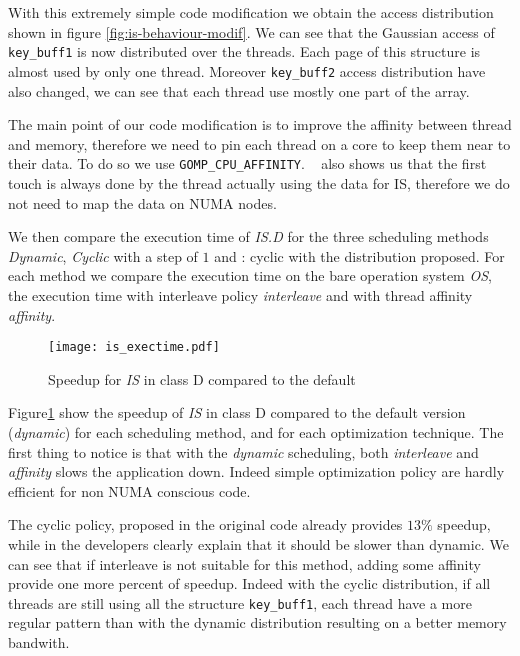 With this extremely simple code modification we obtain the access distribution
shown in figure \ref{fig:is-behaviour-modif}. We can see that the Gaussian
access of \texttt{key\_buff1} is now distributed over the threads. Each page
of this structure is almost used by only one thread. Moreover
\texttt{key\_buff2} access distribution have also changed, we can see that
each thread use mostly one part of the array.

The main point of our code modification is to improve the affinity between
thread and memory, therefore we need to pin each thread on a core to keep them
near to their data. To do so we use \texttt{GOMP\_CPU\_AFFINITY}. \TABARNAC~
also shows us that the first touch is always done by the thread actually using
the data for IS, therefore we do not need to map the data on NUMA nodes.

We then compare the execution time of \emph{IS.D} for the three scheduling
methods \emph{Dynamic}, \emph{Cyclic} with a step of $1$ and \TABARNAC:
cyclic with the distribution proposed. For each method we compare the
execution time on the bare operation system \emph{OS}, the execution time with
interleave policy \emph{interleave} and with thread affinity \emph{affinity}.

\begin{figure}[htpb]
    \centering
    \texttt{[image: is\_exectime.pdf]}
    \caption{Speedup for \emph{IS} in class D compared to the default}
\label{fig:is-res}
\end{figure}

Figure\ref{fig:is-res} show the speedup of \emph{IS} in class D compared to
the default version (\emph{dynamic}) for each scheduling method, and for each
optimization technique. The first thing to notice is that with the
\emph{dynamic} scheduling, both \emph{interleave} and \emph{affinity} slows
the application down. Indeed simple optimization policy are hardly efficient
for non NUMA conscious code.

The cyclic policy, proposed in the original code already provides $13\%$
speedup, while in the developers clearly explain that it should be slower than
dynamic. We can see that if interleave is not suitable for this method, adding
some affinity provide one more percent of speedup. Indeed with the cyclic
distribution, if all threads are still using all the structure
\texttt{key\_buff1}, each thread have a more regular pattern than with the
dynamic distribution resulting on a better memory bandwith.


